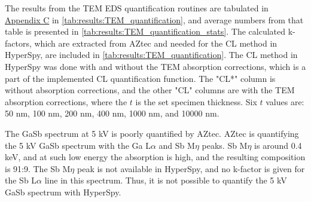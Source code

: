 The results from the TEM EDS quantification routines are tabulated in \hyperref[appendix:tables]{Appendix C} in \cref{tab:results:TEM_quantification}, and average numbers from that table is presented in \cref{tab:results:TEM_quantification_stats}.
The calculated k-factors, which are extracted from AZtec and needed for the CL method in HyperSpy, are included in \cref{tab:results:TEM_quantification}.
The CL method in HyperSpy was done with and without the TEM absorption corrections, which is a part of the implemented CL quantification function.
The "CL*" column is without absorption corrections, and the other "CL" columns are with the TEM absorption corrections, where the $t$ is the set specimen thickness.
Six $t$ values are: 50 nm, 100 nm, 200 nm, 400 nm, 1000 nm, and 10000 nm.


The GaSb spectrum at 5 kV is poorly quantified by AZtec.
AZtec is quantifying the 5 kV GaSb spectrum with the Ga L$\alpha$ and Sb M$\eta$ peaks.
Sb M$\eta$ is around 0.4 keV, and at such low energy the absorption is high, and the resulting composition is 91:9.
The Sb M$\eta$ peak is not available in HyperSpy, and no k-factor is given for the Sb L$\alpha$ line in this spectrum.
Thus, it is not possible to quantify the 5 kV GaSb spectrum with HyperSpy.


